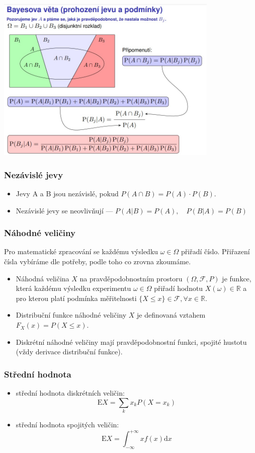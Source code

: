 \includegraphics[width=0.8\textwidth]{img/SP-26_0.jpg}

\subsubsection*{Nezávislé jevy}
\begin{itemize}
	\item Jevy A a B jsou nezávislé, pokud $P(A \cap B) = P(A) \cdot P(B)$.
	\item Nezávislé jevy se neovlivňují --- $P(A|B) = P(A), \quad P(B|A) = P(B)$
\end{itemize}

\subsubsection*{Náhodné veličiny}
Pro matematické zpracování se každému výsledku $\omega \in \Omega$ přiřadí číslo. Přiřazení čísla vybíráme dle potřeby, podle toho co zrovna zkoumáme.
\begin{itemize}
	\item Náhodná veličina $X$ na pravděpodobnostním prostoru $(\Omega, \mathcal{F}, P)$ je funkce, která každému výsledku experimentu $\omega  \in \Omega$  přiřadí hodnotu $X(\omega) \in \mathbb{R}$ a pro kterou platí podmínka měřitelnosti $\{X \leq x\} \in \mathcal{F}, \forall x \in \mathbb{R}$.
	\item Distribuční funkce náhodné veličiny $X$ je definovaná vztahem $F_X(x) = P(X \leq x)$.
	\item Diskrétní náhodné veličiny mají pravděpodobnostní funkci, spojité hustotu (vždy derivace distribuční funkce).
\end{itemize}

\subsubsection*{Střední hodnota}
\begin{itemize}
	\item střední hodnota diskrétních veličin: $$\text{E}X = \sum_k x_k P(X = x_k)$$
	\item střední hodnota spojitých veličin: $$\text{E}X = \int_{-\infty}^{+\infty} xf(x)\text{d}x$$
\end{itemize}

